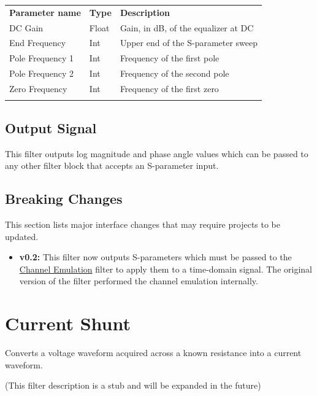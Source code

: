 \begin{tabularx}{16cm}{llX}
\thickhline
\textbf{Parameter name} & \textbf{Type} & \textbf{Description} \\
\thickhline
DC Gain & Float & Gain, in dB, of the equalizer at DC\\
\thinhline
End Frequency & Int & Upper end of the S-parameter sweep\\
\thinhline
Pole Frequency 1 & Int & Frequency of the first pole\\
\thinhline
Pole Frequency 2 & Int & Frequency of the second pole\\
\thinhline
Zero Frequency & Int & Frequency of the first zero\\
\thickhline
\end{tabularx}

\subsection{Output Signal}

This filter outputs log magnitude and phase angle values which can be passed to any other filter block that accepts
an S-parameter input.

\subsection{Breaking Changes}

This section lists major interface changes that may require projects to be updated.

\begin{itemize}
\item \textbf{v0.2:} This filter now outputs S-parameters which must be passed to the
\hyperref[filter:channelemu]{Channel Emulation}  filter to apply them to a time-domain signal. The original version
of the filter performed the channel emulation internally.
\end{itemize}

\pagebreak
\section{Current Shunt}
\label{filter:currentshunt}

Converts a voltage waveform acquired across a known resistance into a current waveform.

(This filter description is a stub and will be expanded in the future)


